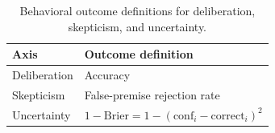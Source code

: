\begin{table}[t]
  \centering
  \caption{Behavioral outcome definitions for deliberation, skepticism, and uncertainty.}
  \label{tab:axis-outcomes}
  \begin{tabular}{ll}
    \toprule
    Axis & Outcome definition \\
    \midrule
    Deliberation & Accuracy \\
    Skepticism & False-premise rejection rate \\
    Uncertainty & $1 - \mathrm{Brier} = 1 - (\mathrm{conf}_i - \mathrm{correct}_i)^2$ \\
    \bottomrule
  \end{tabular}
\end{table}
